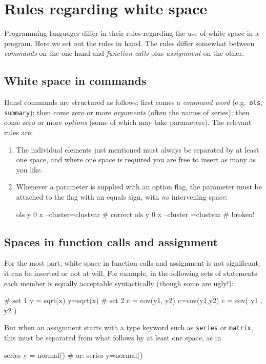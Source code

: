 
\chapter{Rules regarding white space}

Programming languages differ in their rules regarding the use of white
space in a program. Here we set out the rules in hansl.  The rules
differ somewhat between \textit{commands} on the one hand and
\textit{function calls} plus \textit{assignment} on the other.

\section{White space in commands}

Hansl commands are structured as follows: first comes a
\textit{command word} (e.g.\ \texttt{ols}, \texttt{summary}); then
come zero or more \textit{arguments} (often the names of series); then
come zero or more \textit{options} (some of which may take
parameters). The relevant rules are:
\begin{enumerate}
\item The individual elements just mentioned must always be separated
  by at least one space, and where one space is required you are free
  to insert as many as you like.
\item Whenever a parameter is supplied with an option flag, the
  parameter must be attached to the flag with an equals sign, with
  \textit{no} intervening space:
\begin{code}
ols y 0 x --cluster=clustvar  # correct
ols y 0 x --cluster =clustvar # broken!
\end{code}
\end{enumerate}

\section{Spaces in function calls and assignment}

For the most part, white space in function calls and assignment is not
significant; it can be inserted or not at will. For example, in the
following sets of statements each member is equally acceptable
syntactically (though some are ugly!):
\begin{code}
# set 1
y = sqrt(x)
y=sqrt(x)
# set 2
c = cov(y1, y2)
c=cov(y1,y2)
c  = cov( y1 , y2 )
\end{code}

But when an assignment starts with a type keyword such as
\texttt{series} or \texttt{matrix}, this must be separated from what
follows by at least one space, as in
\begin{code}
series y = normal() # or: series y=normal()
\end{code}

\label{LastPage}


